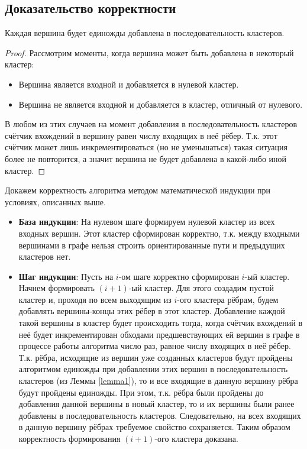\subsection{Доказательство корректности}
\label{sec:validalg}
\begin{lemma}\label{lemma1}
 Каждая вершина будет единожды добавлена в последовательность кластеров.
\end{lemma}
\begin{proof}
Рассмотрим моменты, когда вершина может быть добавлена в некоторый кластер:
\begin{itemize}
	\item Вершина является входной и добавляется в нулевой кластер.
	\item Вершина не является входной и добавляется в кластер, отличный от нулевого.
\end{itemize}
В любом из этих случаев на момент добавления в последовательность кластеров счётчик вхождений в вершину равен числу входящих в неё рёбер. Т.к. этот счётчик может лишь инкрементироваться (но не уменьшаться) такая ситуация более не повторится, а значит вершина не будет добавлена в какой-либо иной кластер.
\end{proof}
\par
Докажем корректность алгоритма методом математической индукции при условиях, описанных выше. 
\begin{itemize}
	\item \textbf{База индукции}: На нулевом шаге формируем нулевой кластер из всех входных вершин. Этот кластер сформирован корректно, т.к. между входными вершинами в графе нельзя строить ориентированные пути и предыдущих кластеров нет.
	\item \textbf{Шаг индукции}: Пусть на $i$-ом шаге корректно сформирован $i$-ый кластер. Начнем формировать $(i+1)$-ый кластер. Для этого создадим пустой кластер и, проходя по всем выходящим из $i$-ого кластера рёбрам, будем добавлять вершины-концы этих рёбер в этот кластер. Добавление каждой такой вершины в кластер будет происходить тогда, когда счётчик вхождений в неё будет инкрементирован обходами предшевствующих ей вершин в графе в процессе работы алгоритма число раз, равное числу входящих в неё рёбер. Т.к. рёбра, исходящие из вершин уже созданных кластеров будут пройдены алгоритмом единожды при добавлении этих вершин в последовательность кластеров (из Леммы \ref{lemma1}), то и все входящие в данную вершину рёбра будут пройдены единожды. При этом, т.к. рёбра были пройдены до добавления данной вершины в новый кластер, то и их вершины были ранее добавлены в последовательность кластеров. Следовательно, на всех входящих в данную вершину рёбрах требуемое свойство сохраняется. Таким образом корректность формирования $(i+1)$-ого кластера доказана.
\end{itemize}
